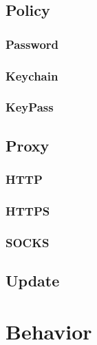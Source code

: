 \section{Policy}



\subsection{Password}


\subsection{Keychain}


\subsection{KeyPass}



\section{Proxy}



\subsection{HTTP}


\subsection{HTTPS}


\subsection{SOCKS}




\section{Update}













\chapter{Behavior}



